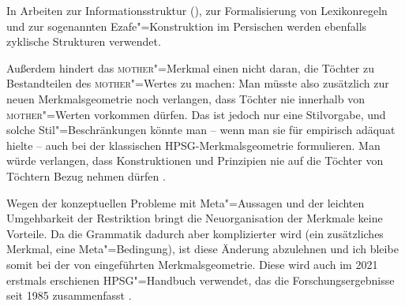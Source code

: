 In Arbeiten zur Informationsstruktur (\citealp[]{EV94a}), zur
Formalisierung von Lexikonregeln \citep[]{Meurers2001a} und zur
sogenannten Ezafe"=Konstruktion im Persischen \citep[]{Samvelian2007a} werden
ebenfalls zyklische Strukturen verwendet.



Außerdem hindert das \textsc{mother}"=Merkmal einen nicht daran, die Töchter zu Bestandteilen des \textsc{mother}"=Wertes zu machen:
\ea
\label{sb-cxg-daughters-in-mother}
\z
Man müsste also zusätzlich zur neuen Merkmalsgeometrie noch verlangen, dass Töchter nie innerhalb
von \textsc{mother}"=Werten vorkommen dürfen. Das ist jedoch nur eine Stilvorgabe, und solche
Stil"=Beschränkungen könnte man -- wenn man sie für empirisch adäquat hielte -- auch bei der
klassischen HPSG-Merkmalsgeometrie formulieren. Man würde verlangen, dass Konstruktionen und Prinzipien nie auf die
Töchter von Töchtern Bezug nehmen dürfen \citep[143--145]{ps}.

Wegen der konzeptuellen Probleme mit Meta"=Aussagen und der leichten Umgehbarkeit der Restriktion
bringt die Neuorganisation der Merkmale keine Vorteile. Da die Grammatik dadurch aber komplizierter
wird (ein zusätzliches Merkmal, eine Meta"=Bedingung), ist diese Änderung abzulehnen und ich bleibe
somit bei der von \citet{Sag97a} eingeführten Merkmalsgeometrie. Diese wird auch im 2021 erstmals erschienen
HPSG"=Handbuch verwendet, das die Forschungsergebnisse seit 1985 zusammenfasst \citep{HPSGHandbook}.


